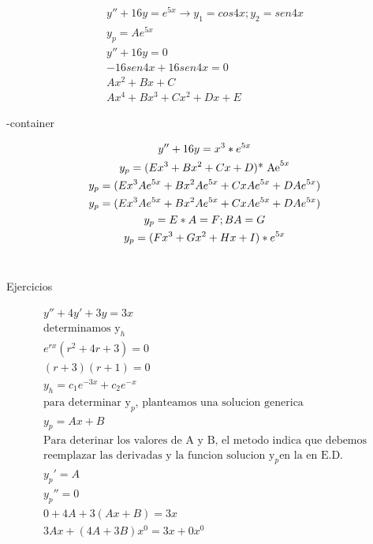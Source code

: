 \documentclass{article}
\begin{document}


\begin{gather*}
y''+16y=e^{5x}  \rightarrow  y_{1} =cos4x  ; y_{2}= sen4x \\
y_{p} =Ae^{5x}  \\
y''+16y=0 \\
-16sen4x + 16sen4x=0 \\
Ax^{2}+Bx+C \\
Ax^{4}+Bx^{3}+Cx^{2}+Dx+E
\end{gather*}




\image-container




\begin{gather*}
y''+16y= x^{3} * e^{5x}     \\
y_{p} = (Ex^{3}+Bx^{2}+Cx+D)\text{* Ae}^{5x}  \\
y_{p} = (Ex^{3}Ae^{5x}+Bx^{2}Ae^{5x}+CxAe^{5x}+DAe^{5x})   \\
y_{p} = (Ex^{3}Ae^{5x}+Bx^{2}Ae^{5x}+CxAe^{5x}+DAe^{5x})  \\
y_{p} = E*A = F  ; BA=G \\
y_{p} = (Fx^{3}+Gx^{2}+Hx+I)* e^{5x}  \\
\vspace{0.5em} \\
\end{gather*}


 Ejercicios




\begin{gather*}
y″+4y′+3y=3x \\
\text{determinamos y}_{h} \\
e^{rx}(r^{2}+4r+3) = 0 \\
(r+3)(r+1) = 0 \\
y_{h} = c_{1}e^{-3x}+c_{2}e^{-x} \\
\text{para determinar y}_{p}\text{, planteamos una solucion generica} \\
y_{p}= Ax+B \\
\text{Para deterinar los valores de A y B, el metodo indica que debemos} \\
\text{reemplazar las derivadas y la funcion solucion y}_{p}\text{en la en E.D.} \\
y_{p}' = A \\
y_{p}''=0 \\
0+4A+3(Ax+B)=3x \\
3Ax +(4A+3B)x^{0} =3x +0x^{0} 
\end{gather*}
\end{document}
